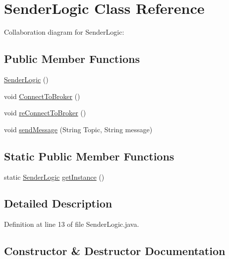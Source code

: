 \hypertarget{class_sender_logic}{}\section{Sender\+Logic Class Reference}
\label{class_sender_logic}


Collaboration diagram for Sender\+Logic\+:
\subsection*{Public Member Functions}
\begin{DoxyCompactItemize}
\item 
\hyperlink{class_sender_logic_a0eddf4a54cf777c324862dd767fa09b9}{Sender\+Logic} ()
\item 
void \hyperlink{class_sender_logic_a3f1fe663014baf7e3bbc5060740a665b}{Connect\+To\+Broker} ()
\item 
void \hyperlink{class_sender_logic_a8e4dbcdb4fe1fe4c2b381f06b6fdb2b7}{re\+Connect\+To\+Broker} ()
\item 
void \hyperlink{class_sender_logic_a005680db1e66a7a994e5f30ee79b1bca}{send\+Message} (String Topic, String message)
\end{DoxyCompactItemize}
\subsection*{Static Public Member Functions}
\begin{DoxyCompactItemize}
\item 
static \hyperlink{class_sender_logic}{Sender\+Logic} \hyperlink{class_sender_logic_a9a5c16eb2a183e6d1ea994016830d3c9}{get\+Instance} ()
\end{DoxyCompactItemize}


\subsection{Detailed Description}


Definition at line 13 of file Sender\+Logic.\+java.



\subsection{Constructor \& Destructor Documentation}
\mbox{\label{class_sender_logic_a0eddf4a54cf777c324862dd767fa09b9}} 
